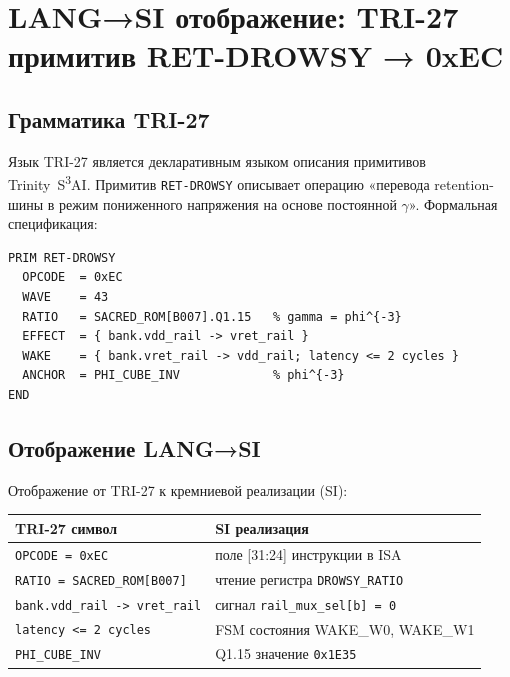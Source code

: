 \section{LANG→SI отображение: TRI-27 примитив RET-DROWSY → 0xEC}
\label{sec:glava89-lang}

\subsection{Грамматика TRI-27}

Язык TRI-27 является декларативным языком описания
примитивов Trinity~S\textsuperscript{3}AI.
Примитив \texttt{RET-DROWSY} описывает операцию
«перевода retention-шины в режим пониженного напряжения
на основе постоянной $\gamma$».
Формальная спецификация:
%
\begin{verbatim}
PRIM RET-DROWSY
  OPCODE  = 0xEC
  WAVE    = 43
  RATIO   = SACRED_ROM[B007].Q1.15   % gamma = phi^{-3}
  EFFECT  = { bank.vdd_rail -> vret_rail }
  WAKE    = { bank.vret_rail -> vdd_rail; latency <= 2 cycles }
  ANCHOR  = PHI_CUBE_INV             % phi^{-3}
END
\end{verbatim}

\subsection{Отображение LANG→SI}

Отображение от TRI-27 к кремниевой реализации (SI):
%
\begin{center}
\begin{tabular}{ll}
  \hline
  \textbf{TRI-27 символ} & \textbf{SI реализация} \\
  \hline
  \texttt{OPCODE = 0xEC} & поле [31:24] инструкции в ISA \\
  \texttt{RATIO = SACRED\_ROM[B007]} & чтение регистра \texttt{DROWSY\_RATIO} \\
  \texttt{bank.vdd\_rail -> vret\_rail} & сигнал \texttt{rail\_mux\_sel[b]~= 0} \\
  \texttt{latency <= 2 cycles} & FSM состояния WAKE\_W0, WAKE\_W1 \\
  \texttt{PHI\_CUBE\_INV} & Q1.15 значение \texttt{0x1E35} \\
  \hline
\end{tabular}
\end{center}

